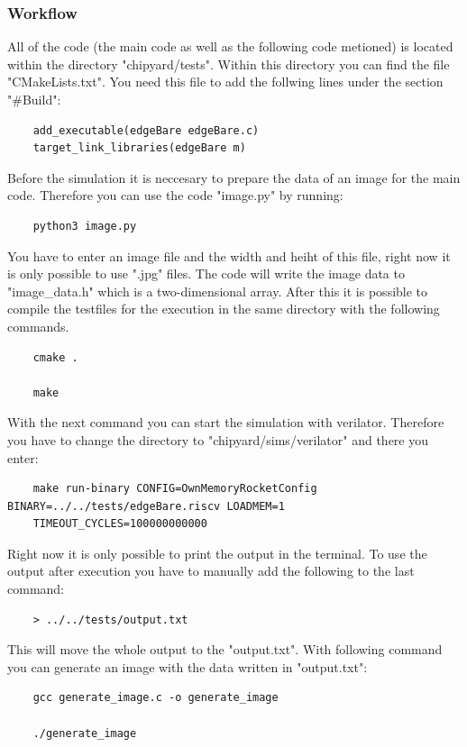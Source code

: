 \documentclass{article}
\begin{document}
{\subsubsection*{Workflow}
All of the code (the main code as well as the following code metioned) is located within the directory "chipyard/tests". 
Within this directory you can find the file "CMakeLists.txt". You need this file to add the follwing lines under the section "\#Build":
\begin{verbatim}
    add_executable(edgeBare edgeBare.c) 
    target_link_libraries(edgeBare m)
\end{verbatim}
Before the simulation it is neccesary to prepare the data of an image for the main code. Therefore you can use the code "image.py" by running:
\begin{verbatim}
    python3 image.py
\end{verbatim}
You have to enter an image file and the width and heiht of this file, right now it is only possible to use ".jpg" files. The code will write the image data to "image\_data.h" which is a two-dimensional array.
After this it is possible to compile the testfiles for the execution in the same directory with the following commands.
\begin{verbatim}
    cmake . 

    make 
\end{verbatim}
With the next command you can start the simulation with verilator. Therefore you have to change the directory to "chipyard/sims/verilator" and there you enter:
\begin{verbatim}
    make run-binary CONFIG=OwnMemoryRocketConfig BINARY=../../tests/edgeBare.riscv LOADMEM=1 
    TIMEOUT_CYCLES=100000000000
\end{verbatim}
Right now it is only possible to print the output in the terminal. To use the output after execution you have to manually add the following to the last command:
\begin{verbatim}
    > ../../tests/output.txt
\end{verbatim} 
This will move the whole output to the "output.txt". With following command you can generate an image with the data written in "output.txt":
\begin{verbatim}
    gcc generate_image.c -o generate_image

    ./generate_image
\end{verbatim}


}
\end{document}
